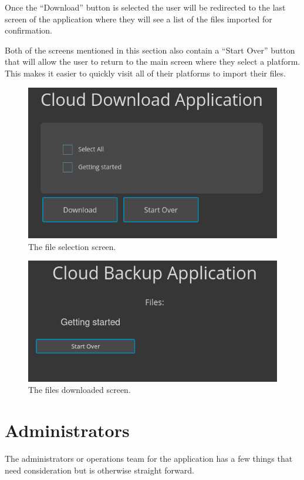 \documentclass{article}
\begin{document}
      Once the ``Download'' button is selected the user will be redirected to the last screen of the application where they will see a list of the files imported for confirmation.

      Both of the screens mentioned in this section also contain a ``Start Over'' button that will allow the user to return to the main screen where they select a platform. This makes it easier to quickly visit all of
      their platforms to import their files.

      \begin{figure}[p]
        \includegraphics[scale=.75]{ug_select}
        \centering
        \caption{The file selection screen.}
      \end{figure}

      \begin{figure}[p]
        \includegraphics[scale=.75]{ug_success}
        \centering
        \caption{The files downloaded screen.}
      \end{figure}

    \section{Administrators}
    The administrators or operations team for the application has a few things that need consideration but is otherwise straight forward.
\end{document}
